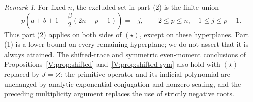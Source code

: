 \documentclass[11pt,a4paper]{article}
\theoremstyle{definition}
\theoremstyle{remark}
\newtheorem{remark}[theorem]{Remark}
\numberwithin{equation}{section}
\begin{document}
\begin{remark}
For fixed $n$, the excluded set in part (2) is the finite union
\[
 p\left(a+b+1+\frac\beta2(2n-p-1)\right)=-j,
 \qquad 2\le p\le n,\quad 1\le j\le p-1.
\]
Thus part (2) applies on both sides of $(\star)$, except on these
hyperplanes. Part (1) is a lower bound on every remaining hyperplane;
we do not assert that it is always attained. The shifted-trace and
symmetric even-moment conclusions of Propositions~\ref{V:prop:shifted}
and~\ref{V:prop:shifted-sym} also hold with $(\star)$ replaced by $J=\varnothing$:
the primitive operator and its indicial polynomial are unchanged by
analytic exponential conjugation and nonzero scaling, and the preceding
multiplicity argument replaces the use of strictly negative roots.
\end{remark}
\end{document}
